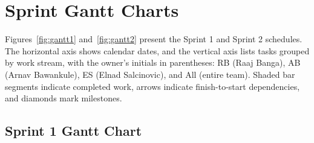 \documentclass[12pt,letterpaper]{article}
\begin{document}
\section{Sprint Gantt Charts}
Figures~\ref{fig:gantt1} and~\ref{fig:gantt2} present the Sprint 1 and Sprint 2
schedules. The horizontal axis shows calendar dates, and the vertical axis lists tasks
grouped by work stream, with the owner's initials in parentheses: RB (Raaj Banga), AB
(Arnav Bawankule), ES (Elnad Salcinovic), and All (entire team). Shaded bar segments
indicate completed work, arrows indicate finish-to-start dependencies, and diamonds
mark milestones.

\subsection{Sprint 1 Gantt Chart}
\end{document}
